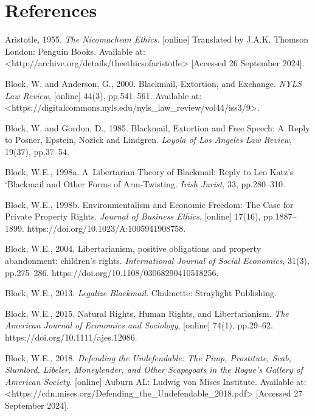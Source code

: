 {\section{References}

Aristotle, 1955. \textit{The Nicomachean Ethics}. [online] Translated by J.A.K. Thomson London: Penguin Books. Available at: {\textless}http://archive.org/details/theethicsofaristotle{\textgreater} [Accessed 26 September 2024].



Block, W. and Anderson, G., 2000. Blackmail, Extortion, and Exchange. \textit{NYLS Law Review}, [online] 44(3), pp.541–561. Available at: {\textless}https://digitalcommons.nyls.edu/nyls\_law\_review/vol44/iss3/9{\textgreater}.



Block, W. and Gordon, D., 1985. Blackmail, Extortion and Free Speech: A~Reply to Posner, Epstein, Nozick and Lindgren. \textit{Loyola of Los Angeles Law Review}, 19(37), pp.37–54.



Block, W.E., 1998a. A~Libertarian Theory of Blackmail: Reply to Leo Katz's ‘Blackmail and Other Forms of Arm-Twisting. \textit{Irish Jurist}, 33, pp.280–310.



Block, W.E., 1998b. Environmentalism and Economic Freedom: The Case for Private Property Rights. \textit{Journal of Business Ethics}, [online] 17(16), pp.1887–1899. https://doi.org/10.1023/A:1005941908758.



Block, W.E., 2004. Libertarianism, positive obligations and property abandonment: children's rights. \textit{International Journal of Social Economics}, 31(3), pp.275–286. https://doi.org/10.1108/03068290410518256.



Block, W.E., 2013. \textit{Legalize Blackmail}. Chalmette: Straylight Publishing.



Block, W.E., 2015. Natural Rights, Human Rights, and Libertarianism. \textit{The American Journal of Economics and Sociology}, [online] 74(1), pp.29–62. https://doi.org/10.1111/ajes.12086.



Block, W.E., 2018. \textit{Defending the Undefendable: The Pimp, Prostitute, Scab, Slumlord, Libeler, Moneylender, and Other Scapegoats in the Rogue's Gallery of American Society}. [online] Auburn AL: Ludwig von Mises Institute. Available at: {\textless}https://cdn.mises.org/Defending\_the\_Undefendable\_2018.pdf{\textgreater} [Accessed 27 September 2024].



}
